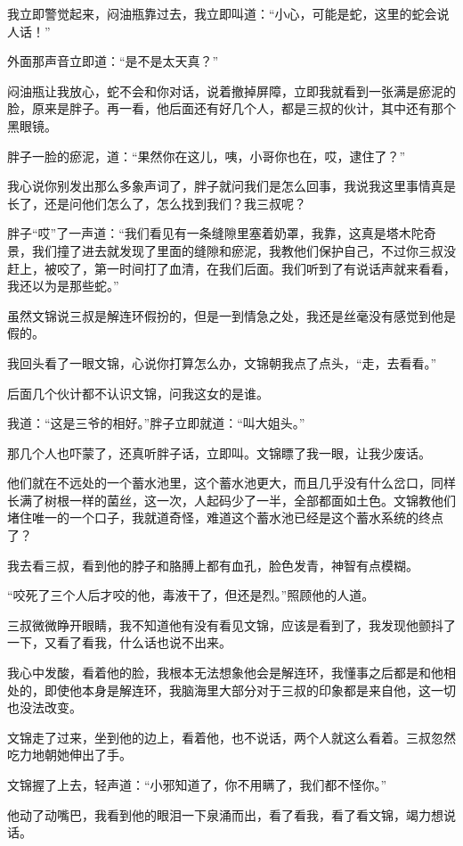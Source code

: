 我立即警觉起来，闷油瓶靠过去，我立即叫道：“小心，可能是蛇，这里的蛇会说人话！”

外面那声音立即道：“是不是太天真？”

闷油瓶让我放心，蛇不会和你对话，说着撤掉屏障，立即我就看到一张满是瘀泥的脸，原来是胖子。再一看，他后面还有好几个人，都是三叔的伙计，其中还有那个黑眼镜。

胖子一脸的瘀泥，道：“果然你在这儿，咦，小哥你也在，哎，逮住了？”

我心说你别发出那么多象声词了，胖子就问我们是怎么回事，我说我这里事情真是长了，还是问他们怎么了，怎么找到我们？我三叔呢？

胖子“哎”了一声道：“我们看见有一条缝隙里塞着奶罩，我靠，这真是塔木陀奇景，我们撞了进去就发现了里面的缝隙和瘀泥，我教他们保护自己，不过你三叔没赶上，被咬了，第一时间打了血清，在我们后面。我们听到了有说话声就来看看，我还以为是那些蛇。”

虽然文锦说三叔是解连环假扮的，但是一到情急之处，我还是丝毫没有感觉到他是假的。

我回头看了一眼文锦，心说你打算怎么办，文锦朝我点了点头，“走，去看看。”

后面几个伙计都不认识文锦，问我这女的是谁。

我道：“这是三爷的相好。”胖子立即就道：“叫大姐头。”

那几个人也吓蒙了，还真听胖子话，立即叫。文锦瞟了我一眼，让我少废话。

他们就在不远处的一个蓄水池里，这个蓄水池更大，而且几乎没有什么岔口，同样长满了树根一样的菌丝，这一次，人起码少了一半，全部都面如土色。文锦教他们堵住唯一的一个口子，我就道奇怪，难道这个蓄水池已经是这个蓄水系统的终点了？

我去看三叔，看到他的脖子和胳膊上都有血孔，脸色发青，神智有点模糊。

“咬死了三个人后才咬的他，毒液干了，但还是烈。”照顾他的人道。

三叔微微睁开眼睛，我不知道他有没有看见文锦，应该是看到了，我发现他颤抖了一下，又看了看我，什么话也说不出来。

我心中发酸，看着他的脸，我根本无法想象他会是解连环，我懂事之后都是和他相处的，即使他本身是解连环，我脑海里大部分对于三叔的印象都是来自他，这一切也没法改变。

文锦走了过来，坐到他的边上，看着他，也不说话，两个人就这么看着。三叔忽然吃力地朝她伸出了手。

文锦握了上去，轻声道：“小邪知道了，你不用瞒了，我们都不怪你。”

他动了动嘴巴，我看到他的眼泪一下泉涌而出，看了看我，看了看文锦，竭力想说话。

